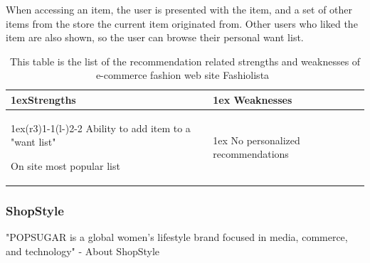     When accessing an item, the user is presented with the item, and a set of other items from the store the current item originated from.
    Other users who liked the item are also shown, so the user can browse their personal want list.
    \begin{table}[H]
                    \centering
                    \begin{tabularx}{\linewidth}{>{\parskip1ex}X@{\kern4\tabcolsep}>{\parskip1ex}X}
                    \toprule
                    \hfil\bfseries Strengths
                    &
                    \hfil\bfseries Weaknesses
                    \\\cmidrule(r{3\tabcolsep}){1-1}\cmidrule(l{-\tabcolsep}){2-2}
                Ability to add item to a "want list" \par
                On site most popular list \par
             & 
                 No personalized recommendations \par
             \\ \bottomrule
        \end{tabularx}
        \caption[Recommendation related strengths and weaknesses of Fashiolista~\cite{Fashiolista}]{This table is the list of the recommendation related strengths and weaknesses of e-commerce fashion web site Fashiolista~\cite{Fashiolista}}
        \label{table:ecommenreceFahiolista}
    \end{table}

\subsubsection{ShopStyle} %
\label{par:shopstyle}
    "POPSUGAR is a global women's lifestyle brand focused in media, commerce, and technology" - About ShopStyle~\cite{ShopStyle}

